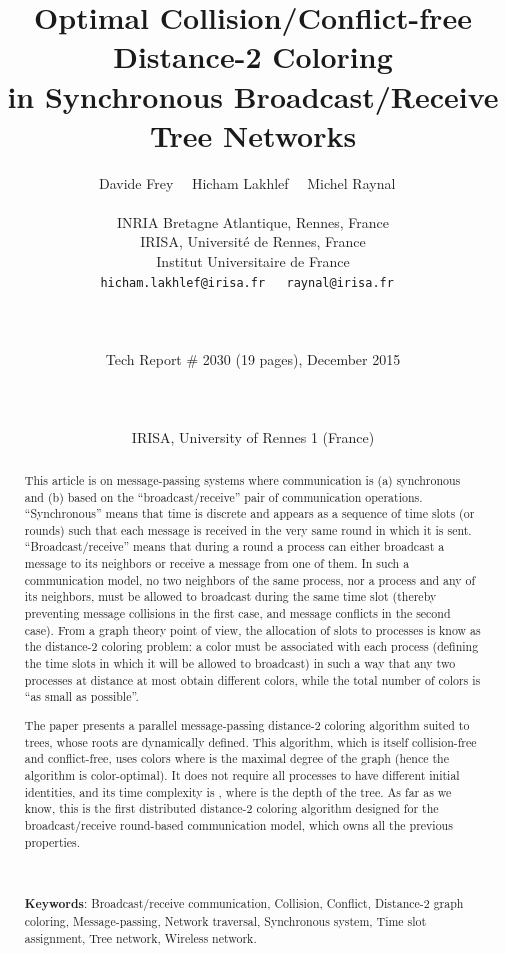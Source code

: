 \documentclass[11pt,english]{article}
\title{\bf  Optimal Collision/Conflict-free Distance-2 Coloring \\
            in  Synchronous  Broadcast/Receive  Tree Networks}
\author{Davide Frey~~  
        Hicham Lakhlef~~ 
        Michel Raynal
~\\~\\
  INRIA Bretagne Atlantique, Rennes,  France \\
  IRISA, Universit\'e de Rennes,  France \\
  Institut Universitaire de France\\
{\small{\tt hicham.lakhlef@irisa.fr ~ raynal@irisa.fr}}
~\\~\\~\\
\centerline{Tech Report \# 2030 (19 pages), December 2015}\\
~\\
\centerline{IRISA, University of Rennes 1 (France)}
}
\date{}
\begin{document}
\maketitle

\begin{abstract}
  This article is on message-passing systems where communication is
  (a) synchronous and (b) based on the ``broadcast/receive'' pair of
  communication operations.  ``Synchronous'' means that time is
  discrete and appears as a sequence of time slots (or rounds) such
  that each message is received in the very same round in which it is
  sent.  ``Broadcast/receive'' means that during a round a process can
  either broadcast a message to its neighbors or receive a message
  from one of them.  In such a communication model, no two neighbors
  of the same process, nor a process and any of its neighbors, must be
  allowed to broadcast during the same time slot (thereby preventing
  message collisions in the first case, and message conflicts in the
  second case).  From a graph theory point of view, the allocation of
  slots to processes is know as the distance-2 coloring problem: a
  color must be associated with each process (defining the time slots
  in which it will be allowed to broadcast) in such a way that any two
  processes at distance at most  obtain different colors, while the
  total number of colors is ``as small as possible''.


  The paper presents a parallel message-passing distance-2 coloring
  algorithm suited to trees, whose roots are dynamically defined. This
  algorithm, which is itself collision-free and conflict-free, uses
   colors where  is the maximal degree of the graph
  (hence the algorithm is color-optimal).  It does not require all
  processes to have different initial identities, and its time
  complexity is , where  is the depth of the tree.  As
  far as we know, this is the first distributed distance-2 coloring
  algorithm designed for the broadcast/receive round-based
  communication model, which owns all the previous properties.

~\\~\\{\bf Keywords}: 
Broadcast/receive communication, Collision, Conflict, 
Distance-2 graph coloring, Message-passing, 
Network traversal, Synchronous system, Time slot assignment,
Tree network, Wireless network. 
\end{abstract}



\thispagestyle{empty}
\newpage
\setcounter{page}{1}
\end{document}
